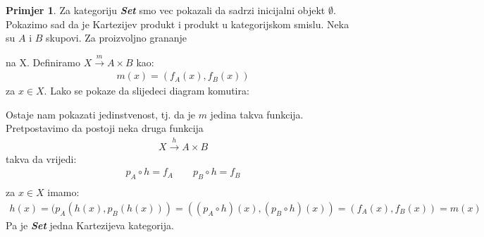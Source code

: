 \documentclass[11pt]{article}
\newcommand{\category}[1]{\textbf{\emph{#1}}}
\theoremstyle{definition}
\newtheorem{primjer}{Primjer}
\begin{document}
  \begin{primjer}
    Za kategoriju \category{Set} smo vec pokazali da sadrzi inicijalni objekt
    $\emptyset$.
    Pokazimo sad da je Kartezijev produkt i produkt u kategorijskom smislu.
    Neka su $A$ i $B$ skupovi.
    Za proizvoljno grananje
    \begin{center}
    \end{center}
    na X. Definiramo $X \xrightarrow{m} A \times B$ kao:
    \begin{align*}
      m(x) = (f_A(x), f_B(x))
    \end{align*}
    za $x \in X$. Lako se pokaze da slijedeci diagram komutira:
  \begin{center}
  \end{center}
  Ostaje nam pokazati jedinstvenost, tj. da je $m$ jedina takva funkcija.
  Pretpostavimo da postoji neka druga funkcija
  \begin{align*}
    X \xrightarrow{h} A \times B
  \end{align*}
  takva da  vrijedi:
  \begin{align*}
    p_A \circ h = f_A \qquad p_B \circ h = f_B\\
  \end{align*}
  za $x \in X$ imamo:
  \begin{align*}
    h(x) = (p_A(h(x), p_B(h(x))) = ((p_A \circ h )(x), (p_B \circ h)(x)) =
    (f_A(x), f_B(x)) = m(x)
  \end{align*}
  Pa je \category{Set} jedna Kartezijeva kategorija.
  \end{primjer}
\end{document}
